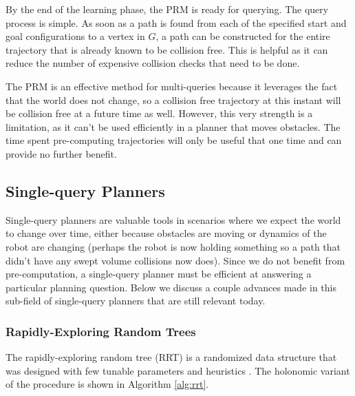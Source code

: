 By the end of the learning phase, the PRM is ready for querying. The query process is simple. As soon as a path is found from each of the specified start and goal configurations to a vertex in $G$, a path can be constructed for the entire trajectory that is already known to be collision free. This is helpful as it can reduce the number of expensive collision checks that need to be done. 

The PRM is an effective method for multi-queries because it leverages the fact that the world does not change, so a collision free trajectory at this instant will be collision free at a future time as well. However, this very strength is a limitation, as it can't be used efficiently in a planner that moves obstacles. The time spent pre-computing trajectories will only be useful that one time and can provide no further benefit.

\subsection{Single-query Planners}
Single-query planners are valuable tools in scenarios where we expect the world to change over time, either because obstacles are moving or dynamics of the robot are changing (perhaps the robot is now holding something so a path that didn't have any swept volume collisions now does). Since we do not benefit from pre-computation, a single-query planner must be efficient at answering a particular planning question. Below we discuss a couple advances made in this sub-field of single-query planners that are still relevant today.

\subsubsection{Rapidly-Exploring Random Trees} \label{planning:rrt}
The rapidly-exploring random tree (RRT) is a randomized data structure that was designed with few tunable parameters and heuristics \cite{lavalle:rrt}. The holonomic variant of the procedure is shown in Algorithm \ref{alg:rrt}.

{}

